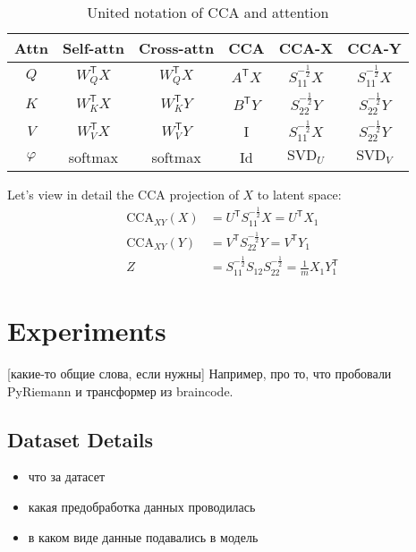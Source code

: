 \documentclass[a4paper,14pt]{article}
\newcommand{\T}{^{\mathsf{T}}}
\theoremstyle{plain} %
\theoremstyle{definition} %
\theoremstyle{remark} %
\begin{document}
	\begin{table}[bhtp]
		\centering
		\begin{tabulary}{\textwidth}{|C|C|C|C|C|C|}
			\hline
			\textbf{Attn} & \textbf{Self-attn} & \textbf{Cross-attn} & \textbf{CCA} & \textbf{CCA-X} & \textbf{CCA-Y} \\
			\hline
			$Q$                & $W_Q\T X$                 & $W_Q\T X$                  & $A\T X$ & $S_{11}^{-\frac{1}{2}}X$ & $S_{11}^{-\frac{1}{2}}X$  \\
			\hline
			$K$                & $W_K\T X$                 & $W_K\T Y$                  & $B\T Y$ & $S_{22}^{-\frac{1}{2}}Y$ & $S_{22}^{-\frac{1}{2}}Y$    \\
			\hline
			$V$                & $W_V\T X$                 & $W_V\T Y$                  & I & $S_{11}^{-\frac{1}{2}}X$ & $S_{22}^{-\frac{1}{2}}Y$  \\
			\hline 
			$\varphi$ & softmax & softmax & Id & $\text{SVD}_U$ & $\text{SVD}_V$ \\
			\hline  
		\end{tabulary}
		\caption{United notation of CCA and attention}
	\end{table}

	Let's view in detail the CCA projection of $X$ to latent space:
	\begin{equation}
		\begin{aligned}
			\text{CCA}_{XY}(X) &= U\T S_{11}^{-\frac{1}{2}}X = U\T X_1 \\
			\text{CCA}_{XY}(Y) &= V\T S_{22}^{-\frac{1}{2}}Y = V\T Y_1 \\
			Z &= S_{11}^{- \frac{1}{2}} S_{12} S_{22}^{- \frac{1}{2}} = \frac{1}{m} X_1 Y_1\T
		\end{aligned}
	\end{equation}
        

        \section{Experiments}
        [какие-то общие слова, если нужны] Например, про то, что пробовали PyRiemann и трансформер из braincode.
        \subsection{Dataset Details}
        \begin{itemize}
            \item что за датасет
            \item какая предобработка данных проводилась
            \item в каком виде данные подавались в модель
        \end{itemize}
        
\end{document}
